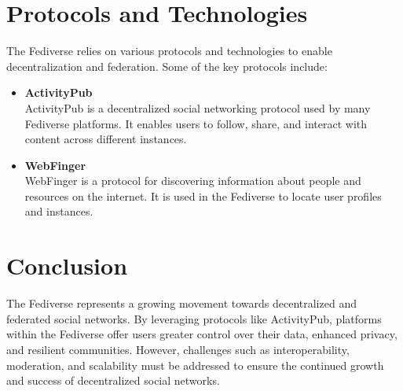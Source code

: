 \section{Protocols and Technologies}

The Fediverse relies on various protocols and technologies to enable decentralization and federation. Some of the key protocols include:\\

\begin{itemize}
  \item \textbf{ActivityPub}\cite{ActivityPub}\\
    ActivityPub is a decentralized social networking protocol used by many Fediverse platforms. It enables users to follow, share, and interact with content across different instances.

  \item \textbf{WebFinger}\cite{webfinger}\\
    WebFinger is a protocol for discovering information about people and resources on the internet. It is used in the Fediverse to locate user profiles and instances.
\end{itemize}

\section{Conclusion}

The Fediverse represents a growing movement towards decentralized and federated social networks. By leveraging protocols like ActivityPub, platforms within the Fediverse offer users greater control over their data, enhanced privacy, and resilient communities. However, challenges such as interoperability, moderation, and scalability must be addressed to ensure the continued growth and success of decentralized social networks.

